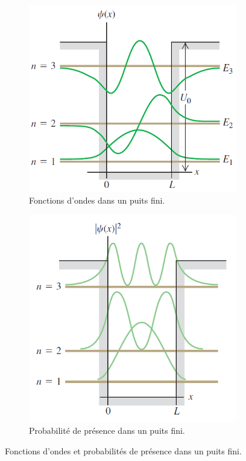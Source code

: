 \begin{figure}[ht]
	\centering
	\begin{subfigure}[b]{0.45\textwidth}
		\centering
		\includegraphics[scale=0.4]{img/puits_fini_1.png}
		\caption{Fonctions d'ondes dans un puits fini.}
		\label{fig:fct-onde-puits-fini}
	\end{subfigure}
	\begin{subfigure}[b]{0.45\textwidth}
		\centering
		\includegraphics[scale=0.4]{img/puits_fini_2.png}
		\caption{Probabilité de présence dans un puits fini.}
		\label{fig:prob-puits-fini}
	\end{subfigure}
	\caption{Fonctions d'ondes et probabilités de présence
	dans un puits fini.}
\end{figure}

